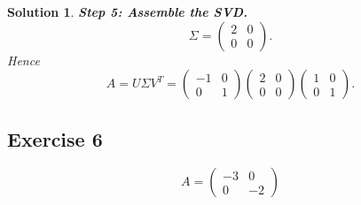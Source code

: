 \documentclass[11pt,a4paper]{article}
\theoremstyle{sol}
\newtheorem*{solution}{Solution}
\begin{document}
\begin{solution}
\textbf{Step 5: Assemble the SVD.}
\[
\Sigma=\begin{pmatrix}2&0\\0&0\end{pmatrix}.
\]
Hence
\[
\boxed{
A=U\Sigma V^T=
\begin{pmatrix}
-1&0\\
0&1
\end{pmatrix}
\begin{pmatrix}
2&0\\
0&0
\end{pmatrix}
\begin{pmatrix}
1&0\\
0&1
\end{pmatrix}.
}
\]
\end{solution}

\clearpage
\subsection*{Exercise 6}
\[
A=\begin{pmatrix}-3&0\\0&-2\end{pmatrix}
\]
\end{document}
